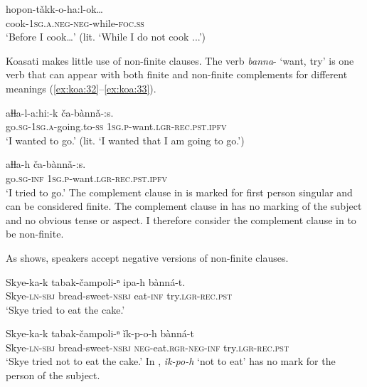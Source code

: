 \documentclass[output=paper,colorlinks,citecolor=brown]{langscibook}
\begin{document}
\ea\label{ex:koa:31}
    \gll hopon-tǎkk-o-ha:l-ok… \\ 
         cook-1\textsc{sg.a}.\textsc{neg}-\textsc{neg}-while-\textsc{foc}.\textsc{ss} \\
    \glt ‘Before I cook…’ (lit. ‘While I do not cook ...’)
\z 

Koasati makes little use of non-finite clauses. The verb \textit{banna}- ‘want, try’ is one verb that can appear with both finite and non-finite complements for different meanings (\ref{ex:koa:32}--\ref{ex:koa:33}).


\ea\label{ex:koa:32}
    \gll aɬɬa-l-a:hi:-k  ča-bànnǎ-:s. \\ 
         go.\textsc{sg}-1\textsc{sg.a}-going.to-\textsc{ss}  1\textsc{sg.p}-want.\textsc{lgr}-\textsc{rec.pst}.\textsc{ipfv} \\
    \glt ‘I wanted to go.’ (lit. ‘I wanted that I am going to go.’)
\z 

\ea\label{ex:koa:33}
    \gll aɬɬa-h  ča-bànnǎ-:s. \\ 
         go.\textsc{sg}-\textsc{inf}  1\textsc{sg.p}-want.\textsc{lgr}-\textsc{rec.pst}.\textsc{ipfv} \\
    \glt ‘I tried to go.’
\z 
The complement clause in  is marked for first person singular and can be considered finite. The complement clause in  has no marking of the subject and no obvious tense or aspect. I therefore consider the complement clause in  to be non-finite.

As  shows, speakers accept negative versions of non-finite clauses.

\ea\label{ex:koa:34}
    \ea\label{ex:koa:34a}
        \gll Skye-ka-k  tabak-čampoli-ⁿ ipa-h  bànná-t.\\
             Skye-\textsc{ln}-\textsc{sbj}  bread-sweet-\textsc{nsbj} eat-\textsc{inf}  try.\textsc{lgr}-\textsc{rec.pst} \\
        \glt ‘Skye tried to eat the cake.’
    
    \ex\label{ex:koa:34b}
        \gll Skye-ka-k  tabak-čampoli-ⁿ ǐk-p-o-h  bànná-t \\ 
             Skye-\textsc{ln}-\textsc{sbj}  bread-sweet-\textsc{nsbj} \textsc{neg}-eat.\textsc{rgr-neg}-\textsc{inf}  try.\textsc{lgr}-\textsc{rec.pst} \\
        \glt ‘Skye tried not to eat the cake.’
    \z
\z 
In , \textit{\v{i}k-po-h} ‘not to eat’ has no mark for the person of the subject.
\end{document}
